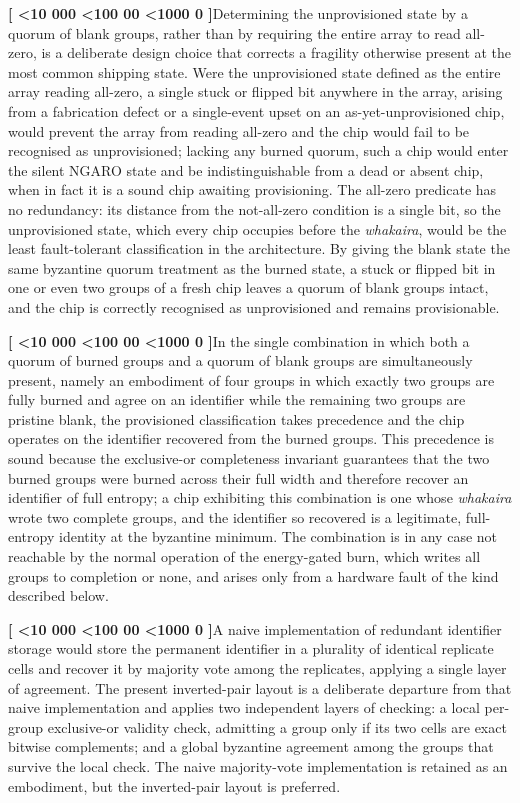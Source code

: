 \documentclass[12pt,letterpaper]{article}
\newcounter{para}
\newcommand{\padzero}{%
  \ifnum\value{para}<10 000\else%
  \ifnum\value{para}<100 00\else%
  \ifnum\value{para}<1000 0\else%
  \fi\fi\fi}
\newcommand{\para}{%
  \refstepcounter{para}\noindent\textbf{[\padzero\arabic{para}]}\hspace{0.5em}\ignorespaces}
\begin{document}
\para Determining the unprovisioned state by a quorum of blank groups, rather than by requiring the entire array to read all-zero, is a deliberate design choice that corrects a fragility otherwise present at the most common shipping state. Were the unprovisioned state defined as the entire array reading all-zero, a single stuck or flipped bit anywhere in the array, arising from a fabrication defect or a single-event upset on an as-yet-unprovisioned chip, would prevent the array from reading all-zero and the chip would fail to be recognised as unprovisioned; lacking any burned quorum, such a chip would enter the silent NGARO state and be indistinguishable from a dead or absent chip, when in fact it is a sound chip awaiting provisioning. The all-zero predicate has no redundancy: its distance from the not-all-zero condition is a single bit, so the unprovisioned state, which every chip occupies before the \emph{whakaira}, would be the least fault-tolerant classification in the architecture. By giving the blank state the same byzantine quorum treatment as the burned state, a stuck or flipped bit in one or even two groups of a fresh chip leaves a quorum of blank groups intact, and the chip is correctly recognised as unprovisioned and remains provisionable.

\para In the single combination in which both a quorum of burned groups and a quorum of blank groups are simultaneously present, namely an embodiment of four groups in which exactly two groups are fully burned and agree on an identifier while the remaining two groups are pristine blank, the provisioned classification takes precedence and the chip operates on the identifier recovered from the burned groups. This precedence is sound because the exclusive-or completeness invariant guarantees that the two burned groups were burned across their full width and therefore recover an identifier of full entropy; a chip exhibiting this combination is one whose \emph{whakaira} wrote two complete groups, and the identifier so recovered is a legitimate, full-entropy identity at the byzantine minimum. The combination is in any case not reachable by the normal operation of the energy-gated burn, which writes all groups to completion or none, and arises only from a hardware fault of the kind described below.

\para A naive implementation of redundant identifier storage would store the permanent identifier in a plurality of identical replicate cells and recover it by majority vote among the replicates, applying a single layer of agreement. The present inverted-pair layout is a deliberate departure from that naive implementation and applies two independent layers of checking: a local per-group exclusive-or validity check, admitting a group only if its two cells are exact bitwise complements; and a global byzantine agreement among the groups that survive the local check. The naive majority-vote implementation is retained as an embodiment, but the inverted-pair layout is preferred.
\end{document}
